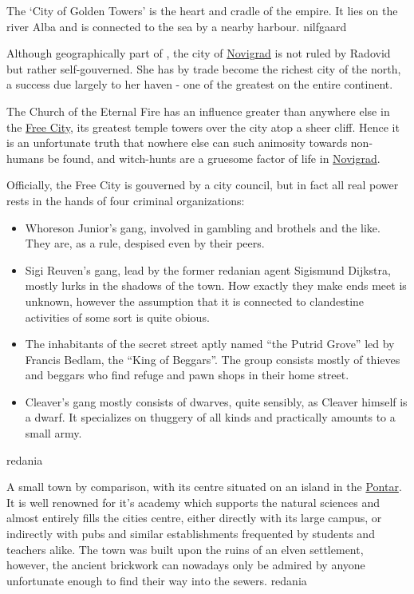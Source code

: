 {
    The `City of Golden Towers' is the heart and cradle of the empire. It lies on the river Alba and is connected to the
    sea by a nearby harbour.
}
{nilfgaard}

{
    Although geographically part of , the city of \hyperref[city:novigrad]{Novigrad} is not ruled by Radovid but rather self-gouverned.
    She has by trade become the richest city of the north, a success due largely to her haven - one of the greatest on the entire continent.

    The Church of the Eternal Fire has an influence greater than anywhere else in the \hyperref[city:novigrad]{Free City}, its greatest temple towers over the city atop a sheer cliff.
    Hence it is an unfortunate truth that nowhere else can such animosity towards non-humans be found, and witch-hunts are a gruesome factor of life in \hyperref[city:novigrad]{Novigrad}.

    Officially, the Free City is gouverned by a city council, but in fact all real power rests in the hands of four criminal organizations:
    \begin{itemize}
    	\item Whoreson Junior's gang, involved in gambling and brothels and the like. They are, as a rule, despised even by their peers.
    	\item Sigi Reuven's gang, lead by the former redanian agent Sigismund Dijkstra, mostly lurks in the shadows of the town.
    	      How exactly they make ends meet is unknown, however the assumption that it is connected to clandestine activities of some sort
    	      is quite obious.
    	\item The inhabitants of the secret street aptly named ``the Putrid Grove'' led by Francis Bedlam, the ``King of Beggars''.
    	      The group consists mostly of thieves and beggars who find refuge and pawn shops in their home street.
    	\item Cleaver's gang mostly consists of dwarves, quite sensibly, as Cleaver himself is a dwarf. It specializes on thuggery of all
    	      kinds and practically amounts to a small army.
    \end{itemize}
}
{redania}

{
    A small town by comparison, with its centre situated on an island in the \hyperref[region:pontar]{Pontar}. It is well renowned for it's academy
    which supports the natural sciences and almost entirely fills the cities centre, either directly with its large campus, or indirectly
    with pubs and similar establishments frequented by students and teachers alike. The town was built upon the ruins of an elven settlement,
    however, the ancient brickwork can nowadays only be admired by anyone unfortunate enough to find their way into the sewers.
}
{redania}

